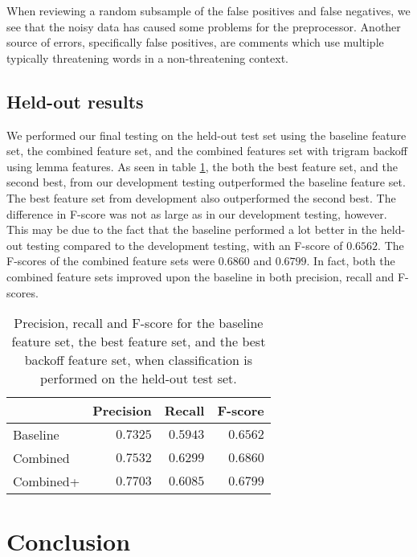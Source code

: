 \documentclass[11pt,letterpaper]{article}
\begin{document}
When reviewing a random subsample of the false positives and false negatives, we see that the noisy data has caused some problems for the preprocessor. Another source of errors, specifically false positives, are comments which use multiple typically threatening words in a non-threatening context.

\subsection{Held-out results}
\label{sec:heldout}

We performed our final testing on the held-out test set using the baseline feature set, the combined feature set, and the combined features set with trigram backoff using lemma features. As seen in table \ref{tab:heldout}, the both the best feature set, and the second best, from our development testing outperformed the baseline feature set. The best feature set from development also outperformed the second best. The difference in F-score was not as large as in our development testing, however. This may be due to the fact that the baseline performed a lot better in the held-out testing compared to the development testing, with an F-score of $0.6562$. The F-scores of the combined feature sets were $0.6860$ and $0.6799$. In fact, both the combined feature sets improved upon the baseline in both precision, recall and F-scores.



\begin{table}
  \begin{center}
    \begin{tabular}{lrrr}
      \toprule
      
      & Precision & Recall & F-score\\
      \midrule
      Baseline & $0.7325$ & $0.5943$ & $0.6562$ \\
      Combined & $0.7532$ & $0.6299$ & $0.6860$  \\
      Combined+ & $0.7703$ & $0.6085$ & $0.6799$ \\
      
      
      \bottomrule

    \end{tabular}
  \end{center}
  \caption{Precision, recall and F-score for the baseline feature set, the best feature set, and the best backoff feature set, when classification is performed on the held-out test set.}
  \label{tab:heldout}
\end{table}




\section{Conclusion}
\label{sec:disc}



\end{document}
